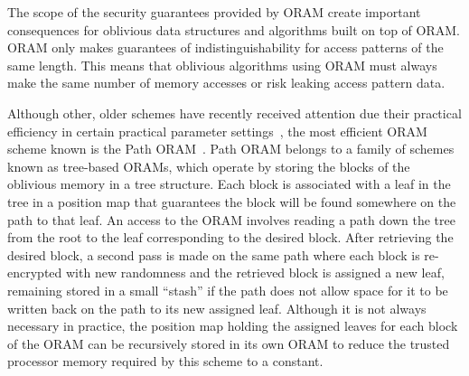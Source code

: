 \documentclass[letterpaper,twocolumn,10pt]{article}
\newcommand{\ignore}[1]{}
\begin{document}
The scope of the security guarantees provided by ORAM create important consequences for oblivious data structures and algorithms built on top of ORAM. ORAM only makes guarantees of indistinguishability for access patterns of the same length. This means that oblivious algorithms using ORAM must always make the same number of memory accesses or risk leaking access pattern data.

Although other, older schemes have recently received attention due their practical efficiency in certain practical parameter settings~\cite{ZWR+16}, the most efficient ORAM scheme known is the Path ORAM~\cite{SDS+13}. Path ORAM belongs to a family of schemes known as tree-based ORAMs, which operate by storing the blocks of the oblivious memory in a tree structure. Each block is associated with a leaf in the tree in a position map that guarantees the block will be found somewhere on the path to that leaf. An access to the ORAM involves reading a path down the tree from the root to the leaf corresponding to the desired block. After retrieving the desired block, a second pass is made on the same path where each block is re-encrypted with new randomness and the retrieved block is assigned a new leaf, remaining stored in a small ``stash'' if the path does not allow space for it to be written back on the path to its new assigned leaf. Although it is not always necessary in practice, the position map holding the assigned leaves for each block of the ORAM can be recursively stored in its own ORAM to reduce the trusted processor memory required by this scheme to a constant.

\ignore{
\subsection{B+ Tree}

The B+ tree is a generalization of the well-known binary search tree and is a data structure frequently used for database indexes~\cite{EN10, BPlus}. All data is kept in the leaves of the tree, and each row in the database is associated with a \textit{key}. Each internal node contains a series of ordered \textit{labels} corresponding to potential values of keys in the table, with the number of children varying between fixed minimum and maximum values. There is one child node between every pair of labels that represents any rows whose key falls between those label values. The algorithm to find a row with a specific key follows the path down the tree to the desired leaf, much like a binary search tree. Each leaf is connnected to the next with a pointer so that it is possible to follow the data sequentially as a linked list once a desired row is found. 

Although the process of looking up data in a B+ tree is fairly straightforward, there are a long list of rules involved in maintaining the invariants mentioned above while inserting or deleting rows. As these details are not immediately relevant to the work presented here, we refer the interested reader to standard database texts (e.g.~\cite{EN10}) for details. 
}
\end{document}
